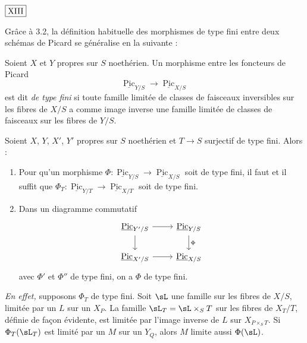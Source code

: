 \begin{flushright}
$\fbox{\text{XIII}}$
\end{flushright}

Grâce à 3.2, la définition habituelle des morphismes de type fini entre deux schémas de Picard se généralise en la suivante :

\begin{defn}\label{def:3.3} Soient $X$ et $Y$ propres sur $S$ noethérien. Un morphisme entre les foncteurs de Picard
\[
\underline{\operatorname{Pic}}_{Y/S} \to \underline{\operatorname{Pic}}_{X/S}
\]
est dit \emph{de type fini} si toute famille limitée de classes de faisceaux inversibles sur les fibres de $X/S$ a comme image inverse une famille limitée de classes de faisceaux sur les fibres de $Y/S$.
\end{defn}

\begin{lem}\label{lem:3.4} Soient $X$, $Y$, $X'$, $Y'$ propres sur $S$ noethérien et $T \to S$ surjectif de type fini. Alors :
\begin{enumerate}[label={\roman*)}]
\item Pour qu'un morphisme $\Phi : \underline{\operatorname{Pic}}_{Y/S} \to \underline{\operatorname{Pic}}_{X/S}$ soit de type fini, il faut et il suffit que $\Phi_T : \underline{\operatorname{Pic}}_{Y/T} \to \underline{\operatorname{Pic}}_{X/T}$ soit de type fini.
\item Dans un diagramme commutatif
\[
\begin{tikzcd}
\underline{\operatorname{Pic}}_{Y'/S} \arrow[r] \arrow[d] & \underline{\operatorname{Pic}}_{Y/S} \arrow[d, "\Phi"] \\
\underline{\operatorname{Pic}}_{X'/S} \arrow[r] & \underline{\operatorname{Pic}}_{X/S}
\end{tikzcd}
\]
avec $\Phi'$ et $\Phi''$ de type fini, on a $\Phi$ de type fini.
\end{enumerate}
\end{lem}

\noindent\textit{En effet,} supposons $\Phi_T$ de type fini. Soit $\sL$ une famille sur les fibres de $X/S$, limitée par un $L$ sur un $X_P$. La famille $\sL_T = \sL \times_S T$ sur les fibres de $X_T/T$, définie de façon évidente, est limitée par l'image inverse de $L$ sur $X_{P \times_S T}$. Si $\Phi_T(\sL_T)$ est limité par un $M$ sur un $Y_Q$, alors $M$ limite aussi $\Phi(\sL)$.

